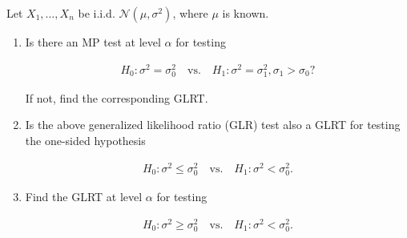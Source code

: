 
\begin{exercise}

    Let $X_1,\dots,X_n$ be i.i.d. $\mathcal{N}(\mu,\sigma^2)$, where $\mu$ is known.
    
    
    \begin{enumerate}[label = (\alph*)]
      \item Is there an MP test at level $\alpha$ for testing
      
      \begin{align*}
          H_0: \sigma^2 = \sigma_0^2 \quad \text{vs.} \quad H_1: \sigma^2 = \sigma_1^2, \sigma_1 > \sigma_0?
      \end{align*}

      If not, find the corresponding GLRT.

      \item Is the above generalized likelihood ratio (GLR) test also a GLRT for testing the
      one-sided hypothesis

      \begin{align*}
          H_0: \sigma^2 \leq \sigma_0^2 \quad \text{vs.} \quad H_1: \sigma^2 < \sigma_0^2.
      \end{align*}

      \item Find the GLRT at level $\alpha$ for testing
      
      \begin{align*}
          H_0: \sigma^2 \geq \sigma_0^2 \quad \text{vs.} \quad H_1: \sigma^2 < \sigma_0^2.
      \end{align*}
    \end{enumerate}
    
    \end{exercise}
    
    
    \begin{solution}
    
    \phantom{}
    
    \end{solution}
    
    